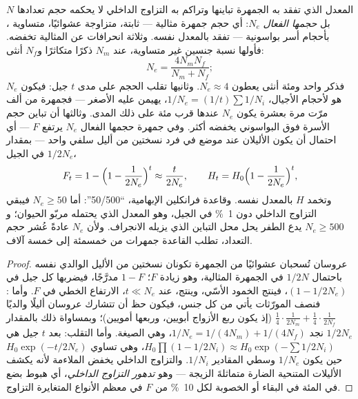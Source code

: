 \begin{theorem}\label{thm:b3:conservation-biology:ne}
المعدل الذي تفقد به الجمهرة تباينها وتراكم به التزاوج
الداخلي لا يحكمه حجم تعدادها $N$ بل
\emph{حجمها الفعال} $N_{e}$: أي حجم جمهرة مثالية ---
ثابتة، متزاوجة عشوائيًا، متساوية ، بأحجام أسر
بواسونية --- تفقد  بالمعدل نفسه. وثلاثة
انحرافات عن المثالية تخفضه. فأولها نسبة جنسين غير متساوية، عند
$N_{m}$ ذكرًا متكاثرًا و$N_{f}$ أنثى:
\[
N_{e} = \frac{4N_{m}N_{f}}{N_{m} + N_{f}} ;
\]
فذكر واحد ومئة أنثى يعطون $N_{e} \approx 4$. وثانيها تقلب الحجم
على مدى $t$ جيل: فيكون $N_{e}$ هو \emph{} لأحجام
الأجيال، $1/N_{e} = (1/t)\sum 1/N_{i}$، يهيمن عليه
الأصغر --- فجمهرة من ألف مرّت مرة بعشرة
يكون $N_{e}$ عندها قرب مئة على ذلك المدى. وثالثها أن تباين حجم الأسرة
فوق البواسوني يخفضه أكثر. وفي جمهرة حجمها الفعال
$N_{e}$ يرتفع \emph{} $F$ --- أي احتمال
أن يكون الأليلان عند موضع في فرد نسختين من أليل سلفي
واحد --- بمقدار $1/2N_{e}$ في الجيل،
\[
F_{t} = 1 - \Bigl(1 - \frac{1}{2N_{e}}\Bigr)^{t} \approx \frac{t}{2N_{e}},
\qquad H_{t} = H_{0}\Bigl(1 - \frac{1}{2N_{e}}\Bigr)^{t} ,
\]
وتخمد \emph{} $H$ بالمعدل نفسه. وقاعدة
فرانكلين الإبهامية، ``50/500'': أما $N_{e} \ge 50$ فيبقي التزاوج الداخلي
دون \qty{1}{\%} في الجيل، وهو المعدل الذي يحتمله مربّو الحيوان؛
و$N_{e} \ge
500$ يدع الطفر يحل محل التباين الذي يزيله الانجراف. ولأن $N_{e}$
عادةً عُشر حجم التعداد، تطلب القاعدة جمهرات
من خمسمئة إلى خمسة آلاف.
\end{theorem}
\begin{proof}
عروسان تُسحبان عشوائيًا من الجمهرة تكونان نسختين من الأليل
الوالدي نفسه باحتمال $1/2N$ في الجمهرة المثالية، وهو
زيادة $F$؛  $1 - F$ مدرَّجًا، فيضربها كل
جيل في $(1 - 1/2N_{e})$، فينتج الخمود
الأسّي، وينتج، عند $t \ll N_{e}$، الارتفاع الخطي في $F$. وأما :
فنصف المورّثات يأتي من كل جنس، فيكون حظ أن تتشارك
عروسان أليلًا والديًا $\tfrac{1}{4}\cdot\tfrac{1}{2N_{m}} +
\tfrac{1}{4}\cdot\tfrac{1}{2N_{f}}$ (إذ يكون ربع الأزواج
أبويين، وربعها أمويين)؛ وبمساواة ذلك بالمقدار $1/2N_{e}$
نجد $1/N_{e} = 1/(4N_{m}) + 1/(4N_{f})$، وهي الصيغة. وأما التقلب:
 بعد $t$ جيل هي $H_{0}\prod(1 - 1/2N_{i})
\approx H_{0}\exp(-\sum 1/2N_{i})$، وهي تساوي $H_{0}\exp(-t/2N_{e})$
حين يكون $1/N_{e}$ وسطي المقادير $1/N_{i}$. والتزاوج الداخلي يخفض
الملاءمة لأنه يكشف الأليلات المتنحية الضارة
متماثلةَ الزيجة --- وهو \emph{تدهور التزاوج الداخلي}، أي هبوط بضع في المئة
في البقاء أو الخصوبة لكل \qty{10}{\%} من $F$ في معظم الأنواع
المتغايرة التزاوج.
\end{proof}

